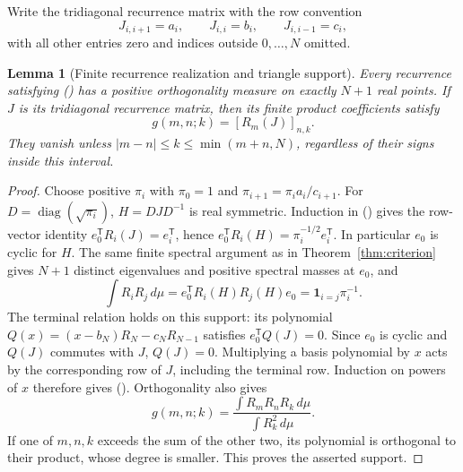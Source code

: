 \documentclass[twoside,10pt]{article}
\numberwithin{equation}{section}
\theoremstyle{slbody}
\newtheorem{lemma}[theorem]{Lemma}
\theoremstyle{definition}
\theoremstyle{remark}
\renewcommand{\eqref}[1]{\textup{{\normalfont(\oldstylenums{\ref{#1}}}\normalfont)}}
\begin{document}
Write the tridiagonal recurrence matrix with the row convention
\[
J_{i,i+1}=a_i,\qquad J_{i,i}=b_i,\qquad J_{i,i-1}=c_i,
\]
with all other entries zero and indices outside $0,\ldots,N$ omitted.

\begin{lemma}[Finite recurrence realization and triangle support]\label{lem:finite}
Every recurrence satisfying \eqref{eq:basic} has a positive orthogonality measure on exactly $N+1$ real points. If $J$ is its tridiagonal recurrence matrix, then its finite product coefficients satisfy
\begin{equation}\label{eq:matrix-product}
g(m,n;k)=[R_m(J)]_{n,k}.
\end{equation}
They vanish unless $|m-n|\leq k\leq\min(m+n,N)$, regardless of their signs inside this interval.
\end{lemma}
\begin{proof}
Choose positive $\pi_i$ with $\pi_0=1$ and $\pi_{i+1}=\pi_i a_i/c_{i+1}$. For $D=\operatorname{diag}(\sqrt{\pi_i})$, $H=DJD^{-1}$ is real symmetric. Induction in \eqref{eq:recurrence} gives the row-vector identity $e_0^\mathsf T R_i(J)=e_i^\mathsf T$, hence $e_0^\mathsf T R_i(H)=\pi_i^{-1/2}e_i^\mathsf T$. In particular $e_0$ is cyclic for $H$. The same finite spectral argument as in Theorem~\ref{thm:criterion} gives $N+1$ distinct eigenvalues and positive spectral masses at $e_0$, and
\[
\int R_iR_j\,d\mu=e_0^\mathsf TR_i(H)R_j(H)e_0
=\boldsymbol1_{i=j}\pi_i^{-1}.
\]
The terminal relation holds on this support: its polynomial $Q(x)=(x-b_N)R_N-c_NR_{N-1}$ satisfies $e_0^\mathsf TQ(J)=0$. Since $e_0$ is cyclic and $Q(J)$ commutes with $J$, $Q(J)=0$.
Multiplying a basis polynomial by $x$ acts by the corresponding row of $J$, including the terminal row. Induction on powers of $x$ therefore gives \eqref{eq:matrix-product}. Orthogonality also gives
\[
g(m,n;k)=\frac{\int R_mR_nR_k\,d\mu}{\int R_k^2\,d\mu}.
\]
If one of $m,n,k$ exceeds the sum of the other two, its polynomial is orthogonal to their product, whose degree is smaller. This proves the asserted support.
\end{proof}
\end{document}
